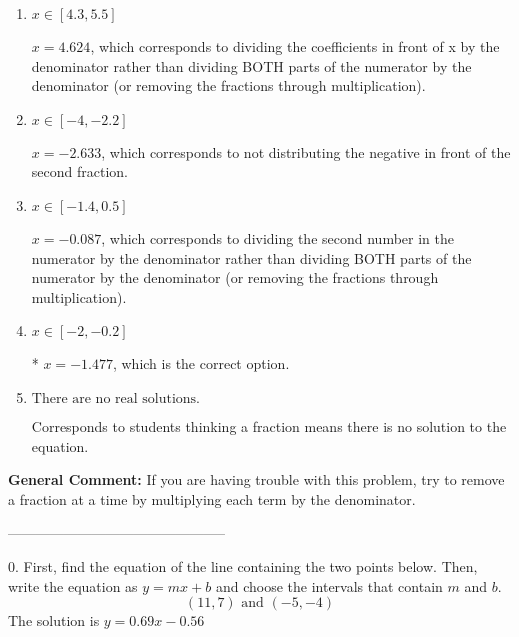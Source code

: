 \documentclass{extbook}[14pt]
\begin{document}
\begin{enumerate}[label=\Alph*.] 
\item $ x \in [4.3, 5.5] $ 

  $x = 4.624$, which corresponds to dividing the coefficients in front of x by the denominator rather than dividing BOTH parts of the numerator by the denominator (or removing the fractions through multiplication). 
\item $ x \in [-4, -2.2] $ 

  $x = -2.633$, which corresponds to not distributing the negative in front of the second fraction. 
\item $ x \in [-1.4, 0.5] $ 

  $x = -0.087$, which corresponds to dividing the second number in the numerator by the denominator rather than dividing BOTH parts of the numerator by the denominator (or removing the fractions through multiplication). 
\item $ x \in [-2, -0.2] $ 

 * $x = -1.477$, which is the correct option. 
\item $ \text{There are no real solutions.} $ 

 Corresponds to students thinking a fraction means there is no solution to the equation. 
\end{enumerate} 
 
\textbf{General Comment:} If you are having trouble with this problem, try to remove a fraction at a time by multiplying each term by the denominator. 

-----------------------------------------------

0. First, find the equation of the line containing the two points below. Then, write the equation as $ y=mx+b $ and choose the intervals that contain $m$ and $b$.
\[ (11, 7) \text{ and } (-5, -4) \] 
The solution is $ y = 0.69x -0.56 $ 
\end{document}
